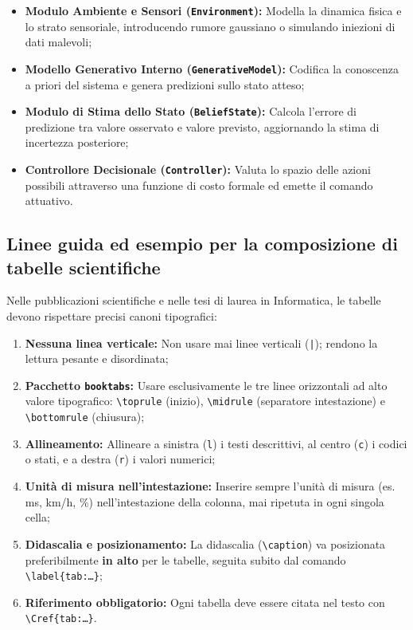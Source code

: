 \begin{itemize}
    \item \textbf{Modulo Ambiente e Sensori (\texttt{Environment}):} Modella la dinamica fisica e lo strato sensoriale, introducendo rumore gaussiano o simulando iniezioni di dati malevoli;
    \item \textbf{Modello Generativo Interno (\texttt{GenerativeModel}):} Codifica la conoscenza a priori del sistema e genera predizioni sullo stato atteso;
    \item \textbf{Modulo di Stima dello Stato (\texttt{BeliefState}):} Calcola l'errore di predizione tra valore osservato e valore previsto, aggiornando la stima di incertezza posteriore;
    \item \textbf{Controllore Decisionale (\texttt{Controller}):} Valuta lo spazio delle azioni possibili attraverso una funzione di costo formale ed emette il comando attuativo.
\end{itemize}


\subsection{Linee guida ed esempio per la composizione di tabelle scientifiche}
\label{sec:esempi-tabelle}

Nelle pubblicazioni scientifiche e nelle tesi di laurea in Informatica, le tabelle devono rispettare precisi canoni tipografici:
\begin{enumerate}
    \item \textbf{Nessuna linea verticale:} Non usare mai linee verticali (\texttt{|}); rendono la lettura pesante e disordinata;
    \item \textbf{Pacchetto \texttt{booktabs}:} Usare esclusivamente le tre linee orizzontali ad alto valore tipografico: \texttt{\textbackslash toprule} (inizio), \texttt{\textbackslash midrule} (separatore intestazione) e \texttt{\textbackslash bottomrule} (chiusura);
    \item \textbf{Allineamento:} Allineare a sinistra (\texttt{l}) i testi descrittivi, al centro (\texttt{c}) i codici o stati, e a destra (\texttt{r}) i valori numerici;
    \item \textbf{Unità di misura nell'intestazione:} Inserire sempre l'unità di misura (es. ms, km/h, \%) nell'intestazione della colonna, mai ripetuta in ogni singola cella;
    \item \textbf{Didascalia e posizionamento:} La didascalia (\texttt{\textbackslash caption}) va posizionata preferibilmente \textbf{in alto} per le tabelle, seguita subito dal comando \texttt{\textbackslash label\{tab:\dots\}};
    \item \textbf{Riferimento obbligatorio:} Ogni tabella deve essere citata nel testo con \texttt{\textbackslash Cref\{tab:\dots\}}.
\end{enumerate}

